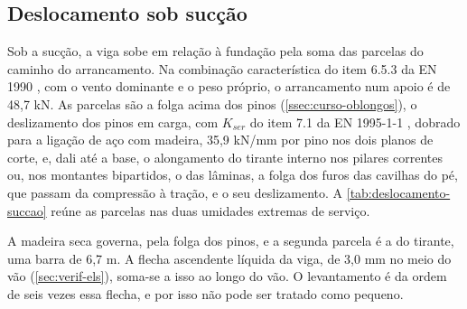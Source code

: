 \subsection{Deslocamento sob sucção}\label{ssec:deslocamento-succao}

Sob a sucção, a viga sobe em relação à fundação pela soma das parcelas do
caminho do arrancamento. Na combinação característica do item 6.5.3 da
EN 1990 \cite{EN1990:2002}, com o vento dominante e o peso próprio, o
arrancamento num apoio é de 48,7 kN. As parcelas são a folga acima dos pinos
(\autoref{ssec:curso-oblongos}), o deslizamento dos pinos em carga, com
$K_{ser}$ do item 7.1 da EN 1995-1-1 \cite{EN1995-1-1:2004}, dobrado para a
ligação de aço com madeira, 35,9 kN/mm por pino nos dois planos de corte, e,
dali até a base, o alongamento do tirante interno nos pilares correntes ou, nos
montantes bipartidos, o das lâminas, a folga dos furos das cavilhas do pé, que
passam da compressão à tração, e o seu deslizamento. A
\autoref{tab:deslocamento-succao} reúne as parcelas nas duas umidades extremas de
serviço.


A madeira seca governa, pela folga dos pinos, e a segunda parcela é a do tirante,
uma barra de 6,7 m. A flecha ascendente líquida da viga, de 3,0 mm no meio do vão
(\autoref{sec:verif-els}), soma-se a isso ao longo do vão. O levantamento é da
ordem de seis vezes essa flecha, e por isso não pode ser tratado como pequeno.

